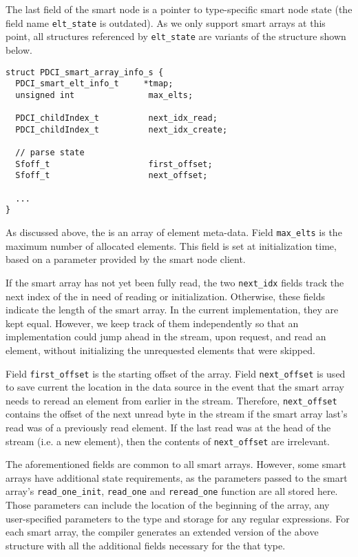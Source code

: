 \documentclass{article}
\begin{document}
The last field of the smart node is a pointer to type-specific smart
node state (the field name \verb|elt_state| is outdated). As we only
support smart arrays at this point, all structures referenced by
\verb|elt_state| are variants of the structure shown below.
\begin{verbatim}
struct PDCI_smart_array_info_s {
  PDCI_smart_elt_info_t     *tmap;
  unsigned int               max_elts;

  PDCI_childIndex_t          next_idx_read;    
  PDCI_childIndex_t          next_idx_create;  

  // parse state
  Sfoff_t                    first_offset;
  Sfoff_t                    next_offset;

  ...  
}
\end{verbatim}
As discussed above, the \emd is an array of element meta-data. Field
\verb|max_elts| is the maximum number of allocated elements. This
field is set at initialization time, based on a parameter provided by
the smart node client.

If the smart array has not yet been fully read, the two
\verb|next_idx| fields track the next index of the \emd in need of
reading or initialization. Otherwise, these fields indicate the length
of the smart array. In the current implementation, they are kept
equal. However, we keep track of them independently so that an
implementation could jump ahead in the stream, upon request, and read
an element, without initializing the unrequested elements that were
skipped. 

Field \verb|first_offset| is the starting offset of the array. Field
\verb|next_offset| is used to save current the location in the data
source in the event that the smart array needs to reread an element
from earlier in the stream. Therefore, \verb|next_offset| contains the
offset of the next unread byte in the stream if the smart array last's
read was of a previously read element. If the last read was at the
head of the stream (i.e. a new element), then the contents of
\verb|next_offset| are irrelevant.

The aforementioned fields are common to all smart arrays. However,
some smart arrays have additional state requirements, as the
parameters passed to the smart array's \verb|read_one_init|,
\verb|read_one| and \verb|reread_one| function are all stored here. Those
parameters can include the location of the beginning of the array, any
user-specified parameters to the type and storage for any regular
expressions. For each smart array, the compiler generates an extended
version of the above structure with all the additional fields
necessary for the that type.
\end{document}
